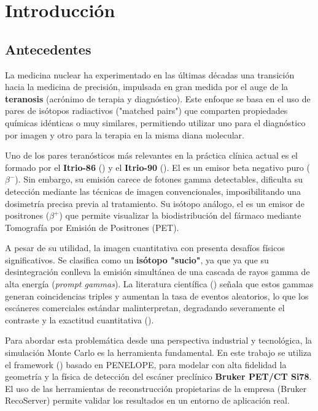 \chapter{Introducción}
\label{cap:introduccion}


\section{Antecedentes}
\label{sec:introduccion:antecedentes}

La medicina nuclear ha experimentado en las últimas décadas una transición hacia la medicina de precisión, impulsada en gran medida
por el auge de la \textbf{teranosis} (acrónimo de terapia y diagnóstico). Este enfoque se basa en el uso de pares de isótopos radiactivos
("matched pairs") que comparten propiedades químicas idénticas o muy similares, permitiendo utilizar uno para el diagnóstico por
imagen y otro para la terapia en la misma diana molecular.

Uno de los pares teranósticos más relevantes en la práctica clínica actual es el formado por el \textbf{Itrio-86} (\yochoseis) y el
\textbf{Itrio-90} (\ynuevecero). El \ynuevecero es un emisor beta negativo puro ($\beta^-$). Sin embargo, su emisión carece de
fotones gamma detectables, dificulta su detección mediante las técnicas de imagen convencionales, imposibilitando una dosimetría
precisa previa al tratamiento. Su isótopo análogo, el \yochoseis es un emisor de positrones ($\beta^+$) que permite visualizar la
biodistribución del fármaco mediante Tomografía por Emisión de Positrones (PET).

A pesar de su utilidad, la imagen cuantitativa con \yochoseis presenta desafíos físicos significativos. Se clasifica como un
\textbf{isótopo "sucio"}, ya que ya que su desintegración conlleva la emisión simultánea de una cascada de rayos gamma de alta
energía (\textit{prompt gammas}). La literatura científica (\cite{Lubberink2011,Conti2016}) señala que estos gammas generan
coincidencias triples y aumentan la tasa de eventos aleatorios, lo que los escáneres comerciales estándar malinterpretan,
degradando severamente el contraste y la exactitud cuantitativa (\cite{Buchholz2003}).

Para abordar esta problemática desde una perspectiva industrial y tecnológica, la simulación Monte Carlo es la herramienta
fundamental. En este trabajo se utiliza el framework \textbf{\penred} (\cite{Gimnez-Alventosa2021})
basado en PENELOPE, para modelar con alta fidelidad la geometría y la física de detección del escáner preclínico
\textbf{Bruker PET/CT Si78}. El uso de las herramientas de reconstrucción propietarias de la empresa (Bruker RecoServer)
permite validar los resultados en un entorno de aplicación real.

